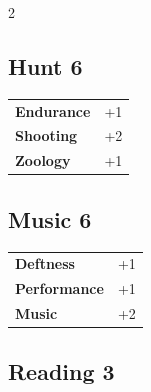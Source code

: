 \begin{multicols}{2}
\begin{tcolorbox}

\end{tcolorbox}

\begin{tcolorbox}
    \subsection*{Hunt \hfill \small{6 }}
    \tcblower




\begin{tabular}{@{}ll@{}}
    \textbf{Endurance} & +1\\
    \textbf{Shooting} & +2\\
    \textbf{Zoology} & +1\\
\end{tabular}


\end{tcolorbox}

\begin{tcolorbox}
    \subsection*{Music \hfill \small{6 }}
    \tcblower




\begin{tabular}{@{}ll@{}}
    \textbf{Deftness} & +1\\
    \textbf{Performance} & +1\\
    \textbf{Music} & +2\\
\end{tabular}


\end{tcolorbox}

\begin{tcolorbox}
    \subsection*{Reading \hfill \small{3 }}
    \tcblower





\end{tcolorbox}
\end{multicols}
